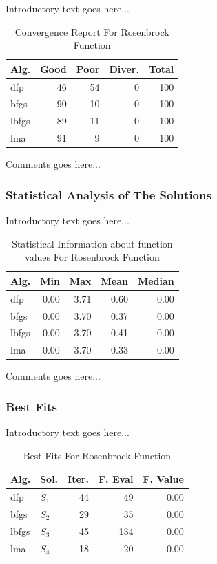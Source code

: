 \documentclass{ieeeaccess}
\begin{document}
Introductory text goes here...
\begin{table}
\centering
\caption{Convergence Report For Rosenbrock Function}
\label{convergence:rosenbrock4d}
\begin{tabular}{lrrrr}
\toprule
 Alg. &  Good &  Poor &  Diver. &  Total \\
\midrule
  dfp &    46 &    54 &       0 &    100 \\
 bfgs &    90 &    10 &       0 &    100 \\
lbfgs &    89 &    11 &       0 &    100 \\
  lma &    91 &     9 &       0 &    100 \\
\bottomrule
\end{tabular}
\end{table}


Comments goes here...
\subsubsection{Statistical Analysis of The Solutions}
\label{statisticalanalysisrosenbrock4d4D}


Introductory text goes here...
\begin{table}
\centering
\caption{Statistical Information about function values For Rosenbrock Function}
\label{function_values:rosenbrock4d}
\begin{tabular}{lrrrr}
\toprule
 Alg. &  Min &  Max &  Mean &  Median \\
\midrule
  dfp & 0.00 & 3.71 &  0.60 &    0.00 \\
 bfgs & 0.00 & 3.70 &  0.37 &    0.00 \\
lbfgs & 0.00 & 3.70 &  0.41 &    0.00 \\
  lma & 0.00 & 3.70 &  0.33 &    0.00 \\
\bottomrule
\end{tabular}
\end{table}


Comments goes here...
\subsubsection{Best Fits}
\label{bestfitsrosenbrock4d4D}


Introductory text goes here...
\begin{table}
\centering
\caption{Best Fits For Rosenbrock Function}
\label{solutions:rosenbrock4d}
\begin{tabular}{llrrr}
\toprule
 Alg. &    Sol. &  Iter. &  F. Eval &  F. Value \\
\midrule
  dfp & $S_{1}$ &     44 &       49 &      0.00 \\
 bfgs & $S_{2}$ &     29 &       35 &      0.00 \\
lbfgs & $S_{3}$ &     45 &      134 &      0.00 \\
  lma & $S_{4}$ &     18 &       20 &      0.00 \\
\bottomrule
\end{tabular}
\end{table}
\end{document}
